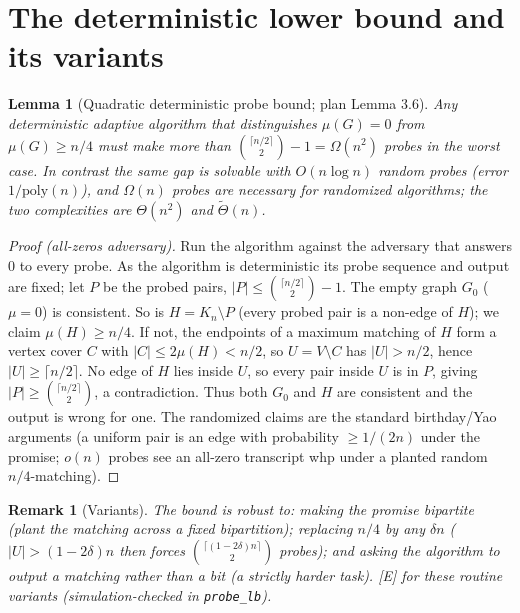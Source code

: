 \documentclass[11pt]{article}
\newcommand{\statusE}{\textsf{\footnotesize[E]}}
\newcommand{\mm}{\mu}
\newtheorem{lemma}{Lemma}
\newtheorem{remark}{Remark}
\begin{document}
\section{The deterministic lower bound and its variants}\label{sec:lemma}

\begin{lemma}[Quadratic deterministic probe bound; plan Lemma 3.6]\label{lem:probe}
Any deterministic adaptive algorithm that distinguishes $\mm(G)=0$ from
$\mm(G)\ge n/4$ must make more than $\binom{\lceil n/2\rceil}{2}-1=\Omega(n^2)$
probes in the worst case. In contrast the same gap is solvable with
$O(n\log n)$ random probes (error $1/\mathrm{poly}(n)$), and $\Omega(n)$
probes are necessary for randomized algorithms; the two complexities are
$\Theta(n^2)$ and $\widetilde{\Theta}(n)$.
\end{lemma}

\begin{proof}[Proof (all-zeros adversary)]
Run the algorithm against the adversary that answers $0$ to every probe. As
the algorithm is deterministic its probe sequence and output are fixed; let
$P$ be the probed pairs, $|P|\le\binom{\lceil n/2\rceil}{2}-1$. The empty
graph $G_0$ ($\mm=0$) is consistent. So is $H=K_n\setminus P$ (every probed
pair is a non-edge of $H$); we claim $\mm(H)\ge n/4$. If not, the endpoints of
a maximum matching of $H$ form a vertex cover $C$ with $|C|\le 2\mm(H)<n/2$, so
$U=V\setminus C$ has $|U|>n/2$, hence $|U|\ge\lceil n/2\rceil$. No edge of $H$
lies inside $U$, so every pair inside $U$ is in $P$, giving
$|P|\ge\binom{\lceil n/2\rceil}{2}$, a contradiction. Thus both $G_0$ and $H$
are consistent and the output is wrong for one. The randomized claims are the
standard birthday/Yao arguments (a uniform pair is an edge with probability
$\ge 1/(2n)$ under the promise; $o(n)$ probes see an all-zero transcript whp
under a planted random $n/4$-matching).
\end{proof}

\begin{remark}[Variants]\label{rem:variants}
The bound is robust to: making the promise \emph{bipartite} (plant the
matching across a fixed bipartition); replacing $n/4$ by any $\delta n$
($|U|>(1-2\delta)n$ then forces $\binom{\lceil(1-2\delta)n\rceil}{2}$ probes);
and asking the algorithm to \emph{output a matching} rather than a bit (a
strictly harder task). \statusE{} for these routine variants
(simulation-checked in \texttt{probe\_lb}).
\end{remark}
\end{document}
